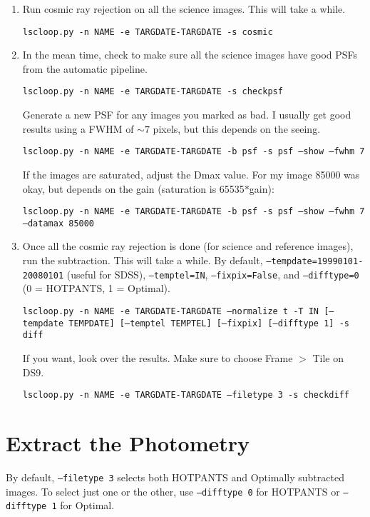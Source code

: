 \begin{enumerate}
\item Run cosmic ray rejection on all the science images. This will take a while.

{\tt lscloop.py -n NAME -e TARGDATE-TARGDATE -s cosmic}

\item In the mean time, check to make sure all the science images have good PSFs from the automatic pipeline.

{\tt lscloop.py -n NAME -e TARGDATE-TARGDATE -s checkpsf}

Generate a new PSF for any images you marked as bad. I usually get good results using a FWHM of $\sim 7$ pixels, but this depends on the seeing.

{\tt lscloop.py -n NAME -e TARGDATE-TARGDATE -b psf -s psf --show --fwhm 7}

If the images are saturated, adjust the Dmax value. For my image 85000 was okay, but depends on the gain (saturation is 65535$*$gain):

{\tt \tt lscloop.py -n NAME -e TARGDATE-TARGDATE -b psf -s psf --show --fwhm 7 --datamax 85000}

\item Once all the cosmic ray rejection is done (for science and reference images), run the subtraction. This will take a while. By default, {\tt --tempdate=19990101-20080101} (useful for SDSS), {\tt --temptel=IN}, {\tt --fixpix=False}, and {\tt --difftype=0} (0 = HOTPANTS, 1 = Optimal).

{\tt lscloop.py -n NAME -e TARGDATE-TARGDATE --normalize t -T IN [--tempdate TEMPDATE] [--temptel TEMPTEL] [--fixpix] [--difftype 1] -s diff}

If you want, look over the results. Make sure to choose Frame $>$ Tile on DS9.

{\tt lscloop.py -n NAME -e TARGDATE-TARGDATE --filetype 3 -s checkdiff}
\end{enumerate}

\section{Extract the Photometry}
By default, {\tt --filetype 3} selects both HOTPANTS and Optimally subtracted images. To select just one or the other, use {\tt --difftype 0} for HOTPANTS or {\tt --difftype 1} for Optimal.

